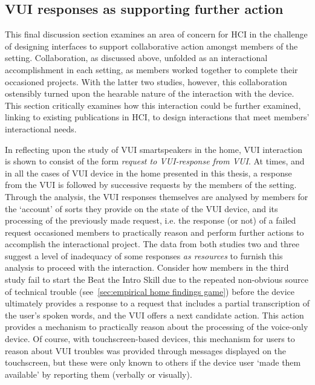 {%



\subsection{VUI responses as supporting further action}\label{sec:synopsis discussion design vuiresponses}
\begin{revisedsubmission}
This final discussion section examines an area of concern for \ac{HCI} in the challenge of designing interfaces to support collaborative action amongst members of the setting.
Collaboration, as discussed above, unfolded as an interactional accomplishment in each setting, as members worked together to complete their occasioned projects.
With the latter two studies, however, this collaboration ostensibly turned upon the hearable nature of the interaction with the device.
This section critically examines how this interaction could be further examined, linking to existing publications in \ac{HCI}, to design interactions that meet members' interactional needs.

In reflecting upon the study of \ac{VUI} smartspeakers in the home, \ac{VUI} interaction is shown to consist of the form \textit{request to \ac{VUI}-response from \ac{VUI}}.
At times, and in all the cases of \ac{VUI} device in the home presented in this thesis, a response from the \ac{VUI} is followed by successive requests by the members of the setting.
Through the analysis, the \ac{VUI} responses themselves are analysed by members for the `account' of sorts they provide on the state of the \ac{VUI} device, and its processing of the previously made request, i.e. the response (or not) of a failed request occasioned members to practically reason and perform further actions to accomplish the interactional project.
The data from both studies two and three suggest a level of inadequacy of some responses \textit{as resources} to furnish this analysis to proceed with the interaction.
Consider how members in the third study fail to start the Beat the Intro Skill due to the repeated non-obvious source of technical trouble (see~\ref{sec:empirical home findings game}) before the device ultimately provides a response to a request that includes a partial transcription of the user's spoken words, and the \ac{VUI} offers a next candidate action.
This action provides a mechanism to practically reason about the processing of the voice-only device.
Of course, with touchscreen-based devices, this mechanism for users to reason about \ac{VUI} troubles was provided through messages displayed on the touchscreen, but these were only known to others if the device user `made them available' by reporting them (verbally or visually).


\end{revisedsubmission}}
